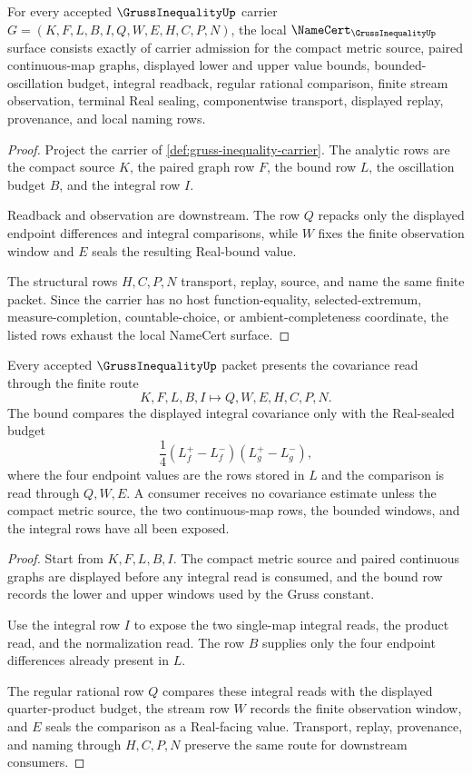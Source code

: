 \begin{theorem}
\label{thm:gruss-inequality-namecert-obligations}
For every accepted $\GrussInequalityUp$ carrier $G=(K,F,L,B,I,Q,W,E,H,C,P,N)$, the local $\NameCert_{\GrussInequalityUp}$ surface consists exactly of carrier admission for the compact metric source, paired continuous-map graphs, displayed lower and upper value bounds, bounded-oscillation budget, integral readback, regular rational comparison, finite stream observation, terminal Real sealing, componentwise transport, displayed replay, provenance, and local naming rows.
\end{theorem}
\begin{proof}
Project the carrier of \autoref{def:gruss-inequality-carrier}. The analytic rows are the compact source $K$, the paired graph row $F$, the bound row $L$, the oscillation budget $B$, and the integral row $I$.

Readback and observation are downstream. The row $Q$ repacks only the displayed endpoint differences and integral comparisons, while $W$ fixes the finite observation window and $E$ seals the resulting Real-bound value.

The structural rows $H,C,P,N$ transport, replay, source, and name the same finite packet. Since the carrier has no host function-equality, selected-extremum, measure-completion, countable-choice, or ambient-completeness coordinate, the listed rows exhaust the local NameCert surface.
\end{proof}

\begin{theorem}
\label{thm:gruss-inequality-integral-covariance-bound}
Every accepted $\GrussInequalityUp$ packet presents the covariance read through the finite route
$$
K,F,L,B,I \longmapsto Q,W,E,H,C,P,N .
$$
The bound compares the displayed integral covariance only with the Real-sealed budget
$$
\frac{1}{4}(L_f^{+}-L_f^{-})(L_g^{+}-L_g^{-}),
$$
where the four endpoint values are the rows stored in $L$ and the comparison is read through $Q,W,E$. A consumer receives no covariance estimate unless the compact metric source, the two continuous-map rows, the bounded windows, and the integral rows have all been exposed.
\end{theorem}
\begin{proof}
Start from $K,F,L,B,I$. The compact metric source and paired continuous graphs are displayed before any integral read is consumed, and the bound row records the lower and upper windows used by the Gruss constant.

Use the integral row $I$ to expose the two single-map integral reads, the product read, and the normalization read. The row $B$ supplies only the four endpoint differences already present in $L$.

The regular rational row $Q$ compares these integral reads with the displayed quarter-product budget, the stream row $W$ records the finite observation window, and $E$ seals the comparison as a Real-facing value. Transport, replay, provenance, and naming through $H,C,P,N$ preserve the same route for downstream consumers.
\end{proof}

